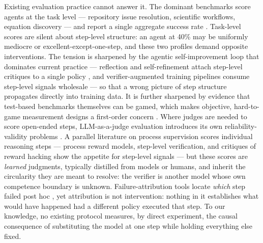 Existing evaluation practice cannot answer it. The dominant benchmarks score agents at the task level --- repository issue resolution, scientific workflows, equation discovery --- and report a single aggregate success rate \cite{yang2024sweagent,deng2025swebench,zhang2025swebench,sun2025scienceboard,shojaee2025llmsrbench,fang2025mlzero}. Task-level scores are silent about step-level structure: an agent at 40\% may be uniformly mediocre or excellent-except-one-step, and these two profiles demand opposite interventions. The tension is sharpened by the agentic self-improvement loop that dominates current practice --- reflection and self-refinement attach step-level critiques to a single policy \cite{yao2022react,shinn2023reflexion,madaan2023selfrefine}, and verifier-augmented training pipelines consume step-level signals wholesale \cite{pan2024training} --- so that a wrong picture of step structure propagates directly into training data. It is further sharpened by evidence that test-based benchmarks themselves can be gamed, which makes objective, hard-to-game measurement designs a first-order concern \cite{yu2026sweabs}. Where judges are needed to score open-ended steps, LLM-as-a-judge evaluation introduces its own reliability-validity problems \cite{gu2024survey,wei2024systematic,norman2026reliability}. A parallel literature on process supervision scores individual reasoning steps --- process reward models, step-level verification, and critiques of reward hacking show the appetite for step-level signals \cite{ma2024what,zhang2025groundedprm,pronesti2026beyond,zhang2026when,nie2026stop} --- but these scores are \emph{learned} judgments, typically distilled from models or humans, and inherit the circularity they are meant to resolve: the verifier is another model whose own competence boundary is unknown. Failure-attribution tools locate \emph{which} step failed post hoc \cite{deng2026defa}, yet attribution is not intervention: nothing in it establishes what would have happened had a different policy executed that step. To our knowledge, no existing protocol measures, by direct experiment, the causal consequence of substituting the model at one step while holding everything else fixed.

